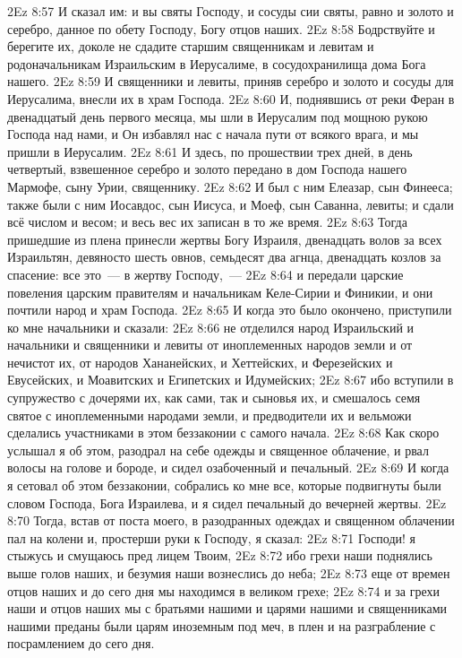 \vs 2Ez 8:57 И сказал им: и вы святы Господу, и сосуды сии святы, равно и золото и серебро, данное по обету Господу, Богу отцов наших.
\vs 2Ez 8:58 Бодрствуйте и берегите их, доколе не сдадите старшим священникам и левитам и родоначальникам Израильским в Иерусалиме, в сосудохранилища дома Бога нашего.
\vs 2Ez 8:59 И священники и левиты, приняв серебро и золото и сосуды для Иерусалима, внесли их в храм Господа.
\rsbpar\vs 2Ez 8:60 И, поднявшись от реки Феран в двенадцатый день первого месяца, мы шли в Иерусалим под мощною рукою Господа над нами, и Он избавлял нас с начала пути от всякого врага, и мы пришли в Иерусалим.
\vs 2Ez 8:61 И здесь, по прошествии трех дней, в день четвертый, взвешенное серебро и золото передано в дом Господа нашего Мармофе, сыну Урии, священнику.
\vs 2Ez 8:62 И был с ним Елеазар, сын Финееса; также были с ним Иосавдос, сын Иисуса, и Моеф, сын Саванна, левиты; и сдали всё числом и весом; и весь вес их записан в то же время.
\vs 2Ez 8:63 Тогда пришедшие из плена принесли жертвы Богу Израиля, двенадцать волов за всех Израильтян, девяносто шесть овнов, семьдесят два агнца, двенадцать козлов за спасение: все это~--- в жертву Господу,~---
\vs 2Ez 8:64 и передали царские повеления царским правителям и начальникам Келе-Сирии и Финикии, и они почтили народ и храм Господа.
\rsbpar\vs 2Ez 8:65 И когда это было окончено, приступили ко мне начальники и сказали:
\vs 2Ez 8:66 не отделился народ Израильский и начальники и священники и левиты от иноплеменных народов земли и от нечистот их, от народов Хананейских, и Хеттейских, и Ферезейских и Евусейских, и Моавитских и Египетских и Идумейских;
\vs 2Ez 8:67 ибо вступили в супружество с дочерями их, как сами, так и сыновья их, и смешалось семя святое с иноплеменными народами земли, и предводители их и вельможи сделались участниками в этом беззаконии с самого начала.
\vs 2Ez 8:68 Как скоро услышал я об этом, разодрал на себе одежды и священное облачение, и рвал волосы на голове и бороде, и сидел озабоченный и печальный.
\vs 2Ez 8:69 И когда я сетовал об этом беззаконии, собрались ко мне все, которые подвигнуты были словом Господа, Бога Израилева, и я сидел печальный до вечерней жертвы.
\rsbpar\vs 2Ez 8:70 Тогда, встав от поста моего, в разодранных одеждах и  священном облачении пал на колени и, простерши руки к Господу, я сказал:
\vs 2Ez 8:71 Господи! я стыжусь и смущаюсь пред лицем Твоим,
\vs 2Ez 8:72 ибо грехи наши поднялись выше голов наших, и безумия наши вознеслись до неба;
\vs 2Ez 8:73 еще от времен отцов наших и до сего дня мы находимся в великом грехе;
\vs 2Ez 8:74 и за грехи наши и отцов наших мы с братьями нашими и царями нашими и священниками нашими преданы были царям иноземным под меч, в плен и на разграбление с посрамлением до сего дня.
